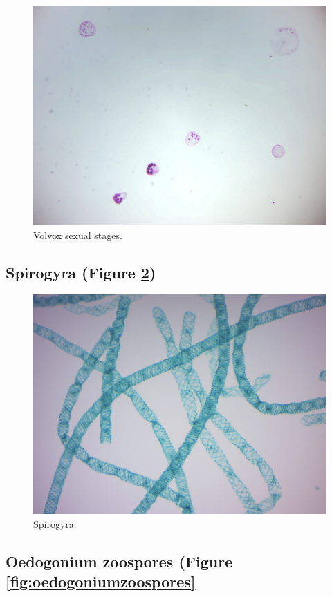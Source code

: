 \begin{figure}

{\centering \includegraphics[width=0.7\linewidth]{./figures/protists/volvox_sex} 

}

\caption{Volvox sexual stages.}\label{fig:volvoxsex}
\end{figure}

\subsection{Spirogyra (Figure
\ref{fig:spirogyraprepared})}\label{spirogyra-figure-reffigspirogyraprepared}

\begin{figure}

{\centering \includegraphics[width=0.7\linewidth]{./figures/protists/Spirogyra_prepared} 

}

\caption{Spirogyra.}\label{fig:spirogyraprepared}
\end{figure}

\subsection{Oedogonium zoospores (Figure
\ref{fig:oedogoniumzoospores}}\label{oedogonium-zoospores-figure-reffigoedogoniumzoospores}

